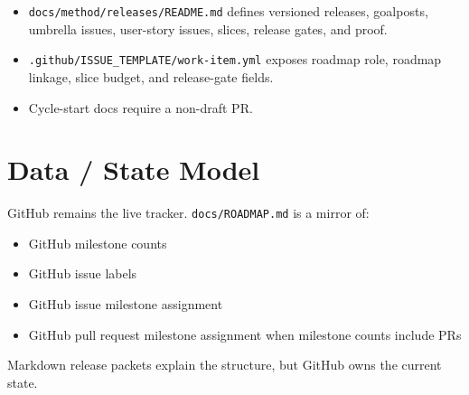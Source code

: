 \begin{itemize}
\tightlist
\item
  \texttt{d\allowbreak{}o\allowbreak{}c\allowbreak{}s\allowbreak{}/\allowbreak{}m\allowbreak{}e\allowbreak{}t\allowbreak{}h\allowbreak{}o\allowbreak{}d\allowbreak{}/\allowbreak{}r\allowbreak{}e\allowbreak{}l\allowbreak{}e\allowbreak{}a\allowbreak{}s\allowbreak{}e\allowbreak{}s\allowbreak{}/\allowbreak{}R\allowbreak{}E\allowbreak{}A\allowbreak{}D\allowbreak{}M\allowbreak{}E\allowbreak{}.\allowbreak{}m\allowbreak{}d} defines versioned releases, goalposts, umbrella issues, user-story issues, slices, release gates, and proof.
\item
  \texttt{.\allowbreak{}g\allowbreak{}i\allowbreak{}t\allowbreak{}h\allowbreak{}u\allowbreak{}b\allowbreak{}/\allowbreak{}I\allowbreak{}S\allowbreak{}S\allowbreak{}U\allowbreak{}E\allowbreak{}\_\allowbreak{}T\allowbreak{}E\allowbreak{}M\allowbreak{}P\allowbreak{}L\allowbreak{}A\allowbreak{}T\allowbreak{}E\allowbreak{}/\allowbreak{}w\allowbreak{}o\allowbreak{}r\allowbreak{}k\allowbreak{}-\allowbreak{}i\allowbreak{}t\allowbreak{}e\allowbreak{}m\allowbreak{}.\allowbreak{}y\allowbreak{}m\allowbreak{}l} exposes roadmap role, roadmap linkage, slice budget, and release-gate fields.
\item
  Cycle-start docs require a non-draft PR.
\end{itemize}

\section{Data / State Model}\label{record-212-data-state-model}

GitHub remains the live tracker. \texttt{d\allowbreak{}o\allowbreak{}c\allowbreak{}s\allowbreak{}/\allowbreak{}R\allowbreak{}O\allowbreak{}A\allowbreak{}D\allowbreak{}M\allowbreak{}A\allowbreak{}P\allowbreak{}.\allowbreak{}m\allowbreak{}d} is a mirror of:

\begin{itemize}
\tightlist
\item
  GitHub milestone counts
\item
  GitHub issue labels
\item
  GitHub issue milestone assignment
\item
  GitHub pull request milestone assignment when milestone counts include PRs
\end{itemize}

Markdown release packets explain the structure, but GitHub owns the current state.

